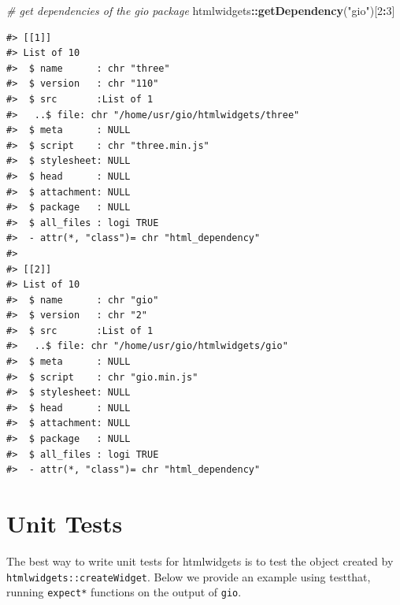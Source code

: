 \documentclass[
  10pt,
]{krantz}
\makeatletter
\newenvironment{Shaded}{\begin{snugshade}}{\end{snugshade}}
\newcommand{\CommentTok}[1]{\textcolor[rgb]{0.37,0.37,0.37}{\textit{#1}}}
\newcommand{\DecValTok}[1]{\textcolor[rgb]{0.06,0.06,0.06}{#1}}
\newcommand{\KeywordTok}[1]{\textcolor[rgb]{0.27,0.27,0.27}{\textbf{#1}}}
\newcommand{\NormalTok}[1]{#1}
\newcommand{\OperatorTok}[1]{\textcolor[rgb]{0.43,0.43,0.43}{\textbf{#1}}}
\newcommand{\StringTok}[1]{\textcolor[rgb]{0.5,0.5,0.5}{#1}}
\newenvironment{kframe}{%
\medskip{}
\setlength{\fboxsep}{.8em}
 \def\at@end@of@kframe{}%
 \ifinner\ifhmode%
  \def\at@end@of@kframe{\end{minipage}}%
  \begin{minipage}{\columnwidth}%
 \fi\fi%
 \def\FrameCommand##1{\hskip\@totalleftmargin \hskip-\fboxsep
 \colorbox{shadecolor}{##1}\hskip-\fboxsep
     \hskip-\linewidth \hskip-\@totalleftmargin \hskip\columnwidth}%
 \MakeFramed {\advance\hsize-\width
   \@totalleftmargin\z@ \linewidth\hsize
   \@setminipage}}%
 {\par\unskip\endMakeFramed%
 \at@end@of@kframe}
\renewenvironment{Shaded}{\begin{kframe}}{\end{kframe}}
\makeatother
\begin{document}
\begin{Shaded}
\begin{Highlighting}[]
\CommentTok{\# get dependencies of the gio package}
\NormalTok{htmlwidgets}\OperatorTok{::}\KeywordTok{getDependency}\NormalTok{(}\StringTok{"gio"}\NormalTok{)[}\DecValTok{2}\OperatorTok{:}\DecValTok{3}\NormalTok{]}
\end{Highlighting}
\end{Shaded}

\begin{verbatim}
#> [[1]]
#> List of 10
#>  $ name      : chr "three"
#>  $ version   : chr "110"
#>  $ src       :List of 1
#>   ..$ file: chr "/home/usr/gio/htmlwidgets/three"
#>  $ meta      : NULL
#>  $ script    : chr "three.min.js"
#>  $ stylesheet: NULL
#>  $ head      : NULL
#>  $ attachment: NULL
#>  $ package   : NULL
#>  $ all_files : logi TRUE
#>  - attr(*, "class")= chr "html_dependency"
#> 
#> [[2]]
#> List of 10
#>  $ name      : chr "gio"
#>  $ version   : chr "2"
#>  $ src       :List of 1
#>   ..$ file: chr "/home/usr/gio/htmlwidgets/gio"
#>  $ meta      : NULL
#>  $ script    : chr "gio.min.js"
#>  $ stylesheet: NULL
#>  $ head      : NULL
#>  $ attachment: NULL
#>  $ package   : NULL
#>  $ all_files : logi TRUE
#>  - attr(*, "class")= chr "html_dependency"
\end{verbatim}

\hypertarget{widgets-adv-unit-tests}{%
\section{Unit Tests}\label{widgets-adv-unit-tests}}

The best way to write unit tests for htmlwidgets is to test the object created by \texttt{htmlwidgets::createWidget}. Below we provide an example using testthat\citep{R-testthat}, running \texttt{expect*} functions on the output of \texttt{gio}.

\begin{Shaded}
\end{Shaded}
\end{document}
